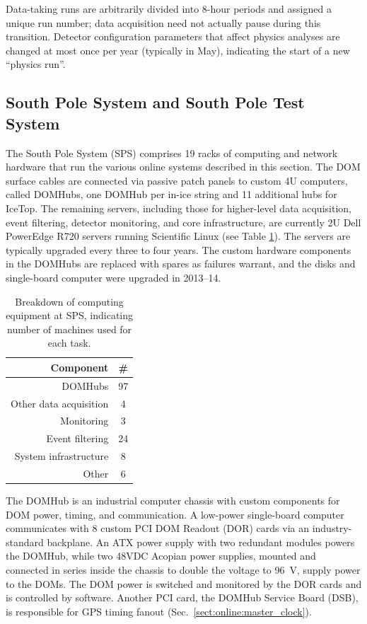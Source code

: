 Data-taking runs are arbitrarily divided into 8-hour periods and assigned
a unique run number; data acquisition need not actually pause during
this transition.  Detector configuration parameters that affect physics
analyses are changed at most once per year (typically in May), indicating
the start of a new ``physics run''.   

\subsection{\label{sect:sps}South Pole System and South Pole Test System}

The South Pole System (SPS) comprises 19 racks of computing and network
hardware that run the various online systems described in this
section.  The DOM surface cables are connected via passive patch panels to
custom 4U computers, called DOMHubs, one DOMHub per in-ice string and 11 additional
hubs for IceTop.  The remaining servers, including those for higher-level
data acquisition, event filtering, detector monitoring, and core
infrastructure, are currently 2U Dell PowerEdge R720 servers running
Scientific Linux (see Table \ref{tab:sps_breakdown}).  The servers are
typically upgraded every three to four years.  The custom hardware components in
the DOMHubs are replaced with spares as failures warrant, and the disks and
single-board computer were upgraded in 2013--14.

\begin{table}[h]
  \centering
\caption{Breakdown of computing equipment at SPS, indicating number of
    machines used for each task.}
  \begin{tabular}{ r  c }
\hline
    Component & \# \\ \hline DOMHubs & 97 \\ Other data
    acquisition & 4 \\
    Monitoring & 3 \\ Event filtering & 24 \\ System infrastructure & 8 \\ Other &
    6 \\
\hline
  \end{tabular}
  \label{tab:sps_breakdown}
\end{table}

The DOMHub is an industrial computer chassis with custom components for DOM
power, timing, and communication.  A low-power single-board computer
communicates with 8 custom PCI DOM Readout (DOR) cards via an
industry-standard backplane.  An ATX power supply with two
redundant modules powers the DOMHub, while two
48VDC Acopian power supplies, mounted and connected in series inside the
chassis to double the voltage to 96~V, supply power to the DOMs.  The DOM power is switched and
monitored by the DOR cards and is controlled by software.  Another PCI
card, the DOMHub Service Board (DSB), is responsible for GPS timing fanout
(Sec.~\ref{sect:online:master_clock}).

